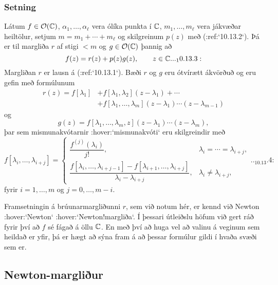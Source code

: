 \subsubsection{Setning}  Látum $f\in {\cal O}({\mathbb C})$, $\alpha_1,\dots,\alpha_\ell$ vera ólíka
punkta í ${\mathbb C}$, $m_1,\dots,m_\ell$ vera jákvæðar heiltölur, setjum
$m=m_1+\cdots+m_\ell$ og skilgreinum $p(z)$ með (:ref:`10.13.2`).  Þá er til
margliða $r$ af stigi $<m$
og $g\in {\cal O}({\mathbb C})$ þannig að
\begin{equation*}
f(z)=r(z)+p(z)g(z), \qquad z\in \C.

.. _10.13.3:

\end{equation*}
Margliðan $r$ er lausn á  (:ref:`10.13.1`).
Bæði $r$ og $g$ eru ótvírætt ákvörðuð og eru gefin með
formúlunum
\begin{align*}
r(z)=f[\lambda_1]&+f[\lambda_1,\lambda_2](z-\lambda_1)+\cdots\\
&+ f[\lambda_1,\dots,\lambda_m](z-\lambda_1)\cdots(z-\lambda_{m-1})
\end{align*}
og 
$$
g(z)=f[\lambda_1,\dots,\lambda_m,z](z-\lambda_1)\cdots(z-\lambda_m),
$$
þar sem mismunakvótarnir :hover:`mismunakvóti` eru skilgreindir með
\begin{equation*}
f[\lambda_i,\dots,\lambda_{i+j}]=
\begin{cases}\dfrac{f^{(j)}(\lambda_i)}{j!},& 
\lambda_i=\cdots=\lambda_{i+j}, \\
\dfrac{f[\lambda_i,\dots,\lambda_{i+j-1}]-f[\lambda_{i+1},\dots,\lambda_{i+j}]}
{\lambda_i-\lambda_{i+j}},&\lambda_i\neq \lambda_{i+j}, 
\end{cases}


.. _10.13.4:

\end{equation*}
fyrir $i=1,\dots,m$ og $j=0,\dots,m-i$.
 


\medskip
Framsetningin  á brúunarmargliðunni
$r$, sem við notum hér, er kennd við
Newton :hover:`Newton` :hover:`Newton!margliða`.  Í þessari útleiðslu
höfum við gert ráð fyrir því að $f$ sé fágað á öllu ${\mathbb C}$.  En með
því að huga vel að valinu á veginum sem heildað er yfir, þá er hægt að
sýna fram á að þessar formúlur gildi í hvaða svæði sem er.


\subsection*{Newton-margliður}


